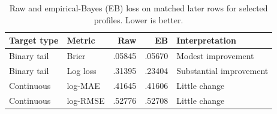 \begin{table}[H]
\centering
\caption{Raw and empirical-Bayes (EB) loss on matched later rows for selected profiles. Lower is better.}
\label{tab:raw-eb-reader-summary}
\small
\renewcommand{\arraystretch}{1.1}
\begin{tabularx}{\textwidth}{@{}l l r r Y@{}}
\toprule
Target type & Metric & Raw & EB & Interpretation \\
\midrule
Binary tail & Brier & .05845 & .05670 & Modest improvement \\
Binary tail & Log loss & .31395 & .23404 & Substantial improvement \\
Continuous & log-MAE & .41645 & .41606 & Little change \\
Continuous & log-RMSE & .52776 & .52708 & Little change \\
\bottomrule
\end{tabularx}
\end{table}
